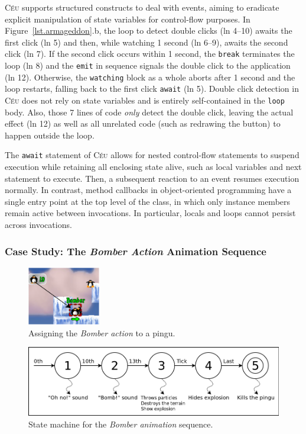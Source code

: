 \documentclass[10pt, conference, compsocconf]{IEEEtran}
\newcommand{\CEU}{\textsc{C\'{e}u}\xspace}
\newcommand{\code}[1] {{\small{\texttt{#1}}}}
\begin{document}
\CEU supports structured constructs to deal with events, aiming to eradicate
explicit manipulation of state variables for control-flow purposes.
%
In Figure~\ref{lst.armageddon}.b, the loop to detect double clicks (ln 4--10)
awaits the first click (ln 5) and then, while watching 1 second (ln 6--9),
awaits the second click (ln 7).
If the second click occurs within 1 second, the \code{break} terminates the
loop (ln 8) and the \code{emit} in sequence signals the double click to the
application (ln 12).
Otherwise, the \code{watching} block as a whole aborts after 1 second  and the
loop restarts, falling back to the first click \code{await} (ln 5).
%
Double click detection in \CEU does not rely on state variables and is entirely
self-contained in the \code{loop} body.
Also, those 7 lines of code \emph{only} detect the double click, leaving the
actual effect (ln 12) as well as all unrelated code (such as redrawing the
button) to happen outside the loop.

The \code{await} statement of \CEU allows for nested control-flow statements to
suspend execution while retaining all enclosing state alive, such as local
variables and next statement to execute.
Then, a subsequent reaction to an event resumes execution normally.
In contrast, method callbacks in object-oriented programming have a single
entry point at the top level of the class, in which only instance members
remain active between invocations.
In particular, locals and loops cannot persist across invocations.

\subsubsection{Case Study: The \emph{Bomber Action} Animation Sequence}
\label{sec.pats.fsms.2}

\begin{figure}
\centering
\includegraphics[width=120px]{bomber-01}
\caption{ Assigning the \emph{Bomber action} to a pingu.
\label{fig.bomber.action}
}
\end{figure}

\begin{figure}
\centering
\includegraphics[width=\columnwidth]{states}
\caption{ State machine for the \emph{Bomber animation} sequence.
\label{fig.bomber.fsm}
}
\end{figure}
\end{document}
